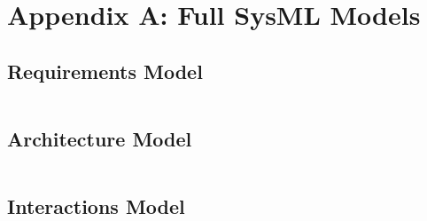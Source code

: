 
\printbibliography[heading=bibintoc,title={References}]



\appendix
\section*{Appendix A: Full SysML Models}

\subsection*{Requirements Model}
\inputminted{text}{ressources/models/requirements.sysml}

\subsection*{Architecture Model}
\inputminted{text}{ressources/models/architecture.sysml}

\subsection*{Interactions Model}
\inputminted{text}{ressources/models/interactions.sysml}



